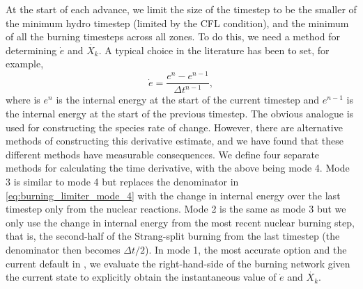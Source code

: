 \documentclass[12pt]{article}
\begin{document}
At the start of each advance, we limit the size of the timestep to be the smaller
of the minimum hydro timestep (limited by the CFL condition), and the minimum of all the
burning timesteps across all zones. To do this, we need a method for determining 
$\dot{e}$ and $\dot{X_k}$. A typical choice in the literature has been to set, for example,
\begin{equation}
  \dot{e} = \frac{e^{n} - e^{n-1}}{\Delta t^{n-1}}, \label{eq:burning_limiter_mode_4}
\end{equation}
where is $e^n$ is the internal energy at the start of the current timestep and
$e^{n-1}$ is the internal energy at the start of the previous timestep. 
The obvious analogue is used for constructing the species rate of change.
However, there are alternative methods of constructing this derivative estimate, 
and we have found that these different methods have measurable consequences.
We define four separate methods for calculating the time derivative, with 
the above being mode 4. Mode 3 is similar to mode 4 but replaces the
denominator in \autoref{eq:burning_limiter_mode_4} with the change in 
internal energy over the last timestep only from the nuclear reactions.
Mode 2 is the same as mode 3 but we only use the change in internal 
energy from the most recent nuclear burning step, that is, the second-half
of the Strang-split burning from the last timestep (the denominator 
then becomes $\Delta t / 2$). In mode 1, the most accurate option and 
the current default in \castro, we evaluate the right-hand-side of the 
burning network given the current state to explicitly obtain the 
instantaneous value of $\dot{e}$ and $\dot{X_k}$. 
\end{document}
